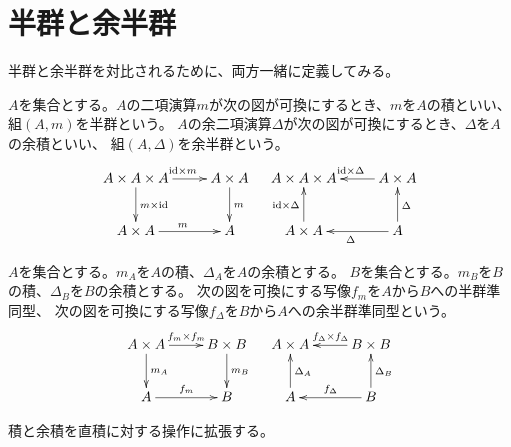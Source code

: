 \section{半群と余半群}\label{s1:半群と余半群} %
	半群と余半群を対比されるために、両方一緒に定義してみる。

	\begin{definition}[半群と余半群]\label{def:半群と余半群} %
		$A$を集合とする。$A$の二項演算$m$が次の図が可換にするとき、$m$を$A$の積といい、
		組$(A,m)$を半群という。
		$A$の余二項演算$\Delta$が次の図が可換にするとき、$\Delta$を$A$の余積といい、
		組$(A,\Delta)$を余半群という。
		\begin{equation}\xymatrix{
			A\times A\times A \ar[d]^{m\times \myid} \ar[r]^{\myid\times m} 
			& A\times A \ar[d]^{m} \\
			A\times A \ar[r]^{m} & A \\
		} \quad \xymatrix{
			A\times A\times A   
			& A\times A \ar[l]_{\myid\times \Delta} \\
			A\times A \ar[u]^{\myid\times \Delta} 
			& A \ar[l]^{\Delta} \ar[u]_{\Delta} \\
		}\end{equation}
	\end{definition} %

	\begin{definition}[半群準同型と余半群準同型]\label{def:半群準同型と余半群準同型} %
		$A$を集合とする。$m_A$を$A$の積、$\Delta_A$を$A$の余積とする。
		$B$を集合とする。$m_B$を$B$の積、$\Delta_B$を$B$の余積とする。
		次の図を可換にする写像$f_m$を$A$から$B$への半群準同型、
		次の図を可換にする写像$f_\Delta$を$B$から$A$への余半群準同型という。
		\begin{equation}\xymatrix{
			A\times A \ar[d]^{m_A} \ar[r]^{f_m\times f_m} & B\times B \ar[d]^{m_B} \\
			A \ar[r]^{f_m} & B \\
		} \quad \xymatrix{
			A\times A & B\times B \ar[l]_{f_\Delta\times f_\Delta} \\
			A \ar[u]_{\Delta_A} & B \ar[u]_{\Delta_B} \ar[l]_{f_\Delta} \\
		}\end{equation}
	\end{definition} %

	積と余積を直積に対する操作に拡張する。


